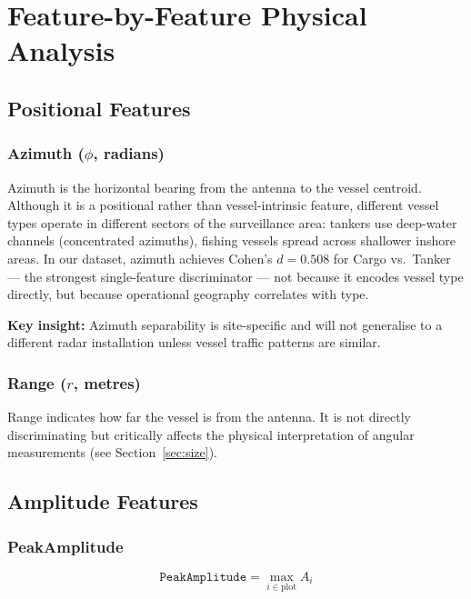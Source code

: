 \documentclass[journal]{IEEEtran}
\begin{document}
\section{Feature-by-Feature Physical Analysis}
\label{sec:features}

\subsection{Positional Features}

\subsubsection{Azimuth ($\phi$, radians)}

Azimuth is the horizontal bearing from the antenna to the vessel centroid.
Although it is a positional rather than vessel-intrinsic feature, different
vessel types operate in different sectors of the surveillance area:
tankers use deep-water channels (concentrated azimuths), fishing vessels spread
across shallower inshore areas. In our dataset, azimuth achieves
Cohen's $d = 0.508$ for Cargo vs.\ Tanker — the strongest single-feature
discriminator — not because it encodes vessel type directly, but because
operational geography correlates with type.

\textbf{Key insight:} Azimuth separability is site-specific and will not
generalise to a different radar installation unless vessel traffic patterns
are similar.

\subsubsection{Range ($r$, metres)}

Range indicates how far the vessel is from the antenna. It is not directly
discriminating but critically affects the physical interpretation of angular
measurements (see Section~\ref{sec:size}).

\subsection{Amplitude Features}
\label{sec:amplitude}

\subsubsection{PeakAmplitude}

\begin{equation}
  \texttt{PeakAmplitude} = \max_{i \in \text{plot}} A_i
\end{equation}
\end{document}
